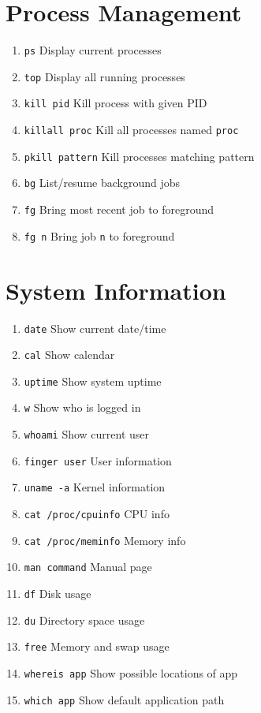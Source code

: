 \documentclass[a4paper,12pt]{article}
\begin{document}
\section{Process Management}
\begin{enumerate}
  \item \texttt{ps} \quad Display current processes
  \item \texttt{top} \quad Display all running processes
  \item \texttt{kill pid} \quad Kill process with given PID
  \item \texttt{killall proc} \quad Kill all processes named \texttt{proc}
  \item \texttt{pkill pattern} \quad Kill processes matching pattern
  \item \texttt{bg} \quad List/resume background jobs
  \item \texttt{fg} \quad Bring most recent job to foreground
  \item \texttt{fg n} \quad Bring job \texttt{n} to foreground
\end{enumerate}

\newpage
\section{System Information}
\begin{enumerate}
  \item \texttt{date} \quad Show current date/time
  \item \texttt{cal} \quad Show calendar
  \item \texttt{uptime} \quad Show system uptime
  \item \texttt{w} \quad Show who is logged in
  \item \texttt{whoami} \quad Show current user
  \item \texttt{finger user} \quad User information
  \item \texttt{uname -a} \quad Kernel information
  \item \texttt{cat /proc/cpuinfo} \quad CPU info
  \item \texttt{cat /proc/meminfo} \quad Memory info
  \item \texttt{man command} \quad Manual page
  \item \texttt{df} \quad Disk usage
  \item \texttt{du} \quad Directory space usage
  \item \texttt{free} \quad Memory and swap usage
  \item \texttt{whereis app} \quad Show possible locations of app
  \item \texttt{which app} \quad Show default application path
\end{enumerate}
\end{document}
